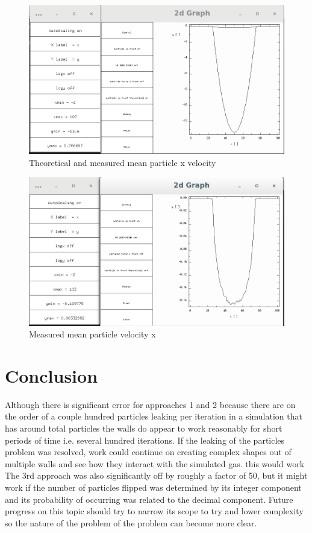 \documentclass{article}
\begin{document}
\begin{figure}[H]
\includegraphics[scale=0.35]{A3p0.png}
\caption{\label{fig} Theoretical and measured mean particle x velocity}
\end{figure}

\begin{figure}[H]
\includegraphics[scale=0.35]{A2p3.png}
\caption{\label{fig} Measured mean particle velocity x}
\end{figure}


\section{Conclusion}

Although there is significant error for approaches 1 and 2 because there are on the order of a couple hundred particles leaking per iteration in a simulation that has around total particles the walls do appear to work reasonably for short periods of time i.e. several hundred iterations. If the leaking of the particles problem was resolved, work could continue on creating complex shapes out of multiple walls and see how they interact with the simulated gas. this would work The 3rd approach was also significantly off by roughly a factor of 50, but it might work if the number of particles flipped was determined by its integer component and its probability of occurring was related to the decimal component. Future progress on this topic should try to narrow its scope to try and lower complexity so the nature of the problem of the problem can become more clear.
\end{document}
